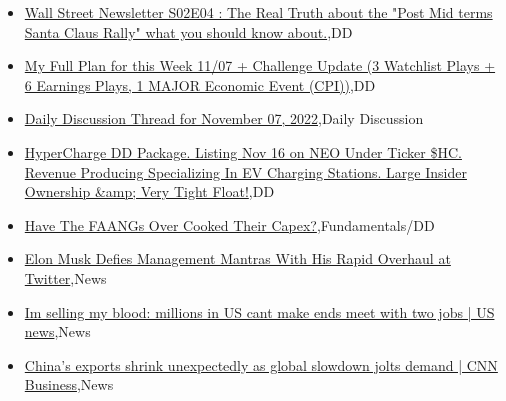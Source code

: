 \documentclass{article}%
\begin{document}
%
\begin{itemize}%
\item%
\href{https://reddit.com/r/wallstreetbets/comments/yolx2b/wall\_street\_newsletter\_s02e04\_the\_real\_truth/}{Wall Street Newsletter S02E04 : The Real Truth about the "Post Mid terms Santa Claus Rally" what you should know about.},DD%
\item%
\href{https://reddit.com/r/wallstreetbets/comments/yokcst/my\_full\_plan\_for\_this\_week\_1107\_challenge\_update/}{My Full Plan for this Week 11/07 + Challenge Update (3 Watchlist Plays + 6 Earnings Plays, 1 MAJOR Economic Event (CPI))},DD%
\item%
\href{https://reddit.com/r/wallstreetbets/comments/yojc6f/daily\_discussion\_thread\_for\_november\_07\_2022/}{Daily Discussion Thread for November 07, 2022},Daily Discussion%
\item%
\href{https://reddit.com/r/Baystreetbets/comments/ymxcej/hypercharge\_dd\_package\_listing\_nov\_16\_on\_neo/}{HyperCharge DD Package. Listing Nov 16 on NEO Under Ticker \$HC. Revenue Producing Specializing In EV Charging Stations. Large Insider Ownership \&amp; Very Tight Float!},DD%
\item%
\href{https://reddit.com/r/StockMarket/comments/yojl59/have\_the\_faangs\_over\_cooked\_their\_capex/}{Have The FAANGs Over Cooked Their Capex?},Fundamentals/DD%
\item%
\href{https://reddit.com/r/Economics/comments/yohya8/elon\_musk\_defies\_management\_mantras\_with\_his/}{Elon Musk Defies Management Mantras With His Rapid Overhaul at Twitter},News%
\item%
\href{https://reddit.com/r/Economics/comments/yofkf9/im\_selling\_my\_blood\_millions\_in\_us\_cant\_make\_ends/}{Im selling my blood: millions in US cant make ends meet with two jobs | US news},News%
\item%
\href{https://reddit.com/r/Economics/comments/yodl2t/chinas\_exports\_shrink\_unexpectedly\_as\_global/}{China's exports shrink unexpectedly as global slowdown jolts demand | CNN Business},News%
\end{itemize}%
\end{document}
